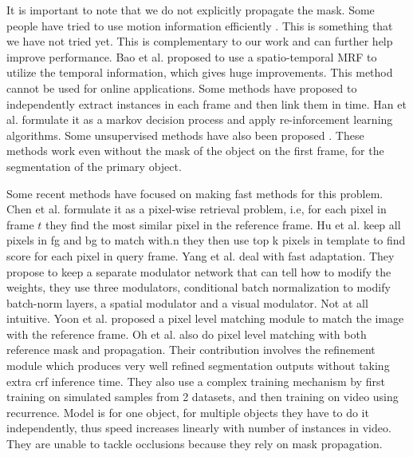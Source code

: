 \documentclass[10pt,twocolumn,letterpaper]{article}
\begin{document}
It is important to note that we do not explicitly propagate the mask.
Some people have tried to use motion information efficiently \cite{Hu_2018_CVPR, Xiao_2018_CVPR, Cheng_2017_ICCV, Jain_2017_CVPR, Tsai_2016_CVPR}. This is something that we have not tried yet. This is complementary to our work and can further help improve performance.
Bao et al.\cite{Bao_2018_CVPR} proposed to use a spatio-temporal MRF to utilize the temporal information, which gives huge improvements. This method cannot be used for online applications.
Some methods\cite{Koh_2018_ECCV, Yeo_2017_CVPR, Yang_2017_CVPR} have proposed to independently extract instances in each frame and then link them in time.
Han et al. \cite{Han_2018_CVPR} formulate it as a markov decision process and apply re-inforcement learning algorithms.
Some unsupervised methods have also been proposed \cite{Li_2018_ECCV_un, Hu_2018_ECCV_un, Li_2018_CVPR, Tokmakov_2017_ICCV, Koh_2017_CVPR, Jain_2017_CVPR}. These methods work even without the mask of the object on the first frame, for the segmentation of the primary object.

Some recent methods have focused on making fast methods for this problem. Chen et al. \cite{Chen_2018_CVPR} formulate it as a pixel-wise retrieval problem, i.e, for each pixel in frame $t$ they find the most similar pixel in the reference frame.
Hu et al. \cite{Hu_2018_ECCV} keep all pixels in fg and bg to match with.n they then use top k pixels in template to find score for each pixel in query frame.
Yang et al. \cite{Yang_2018_CVPR} deal with fast adaptation. They propose to keep a separate modulator network that can tell how to modify the weights, they use three modulators, conditional batch normalization to modify batch-norm layers, a spatial modulator and a visual modulator. Not at all intuitive.
Yoon et al. \cite{Yoon_2017_ICCV} proposed a pixel level matching module to match the image with the reference frame. Oh et al. \cite{Oh_2018_CVPR} also do pixel level matching with both reference mask and propagation. Their contribution involves the refinement module which produces very well refined segmentation outputs without taking extra crf inference time. They also use a complex training mechanism by first training on simulated samples from 2 datasets, and then training on video using recurrence. 
Model is for one object, for multiple objects they have to do it independently, thus speed increases linearly with number of instances in video.
They are unable to tackle occlusions because they rely on mask propagation.
\end{document}

